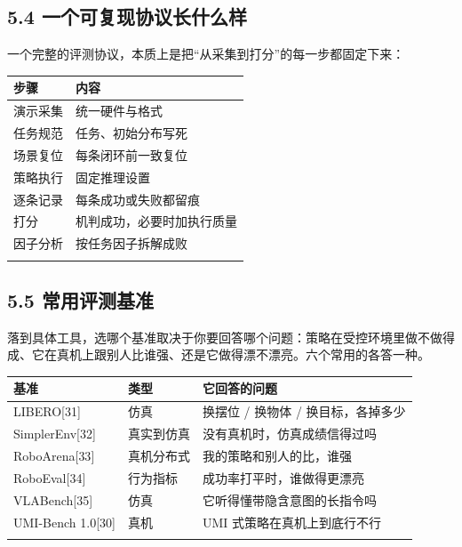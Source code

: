 \documentclass[
  chinese,
]{ctexart}
\begin{document}
\subsection{5.4
一个可复现协议长什么样}\label{ux4e00ux4e2aux53efux590dux73b0ux534fux8baeux957fux4ec0ux4e48ux6837}

一个完整的评测协议，本质上是把``从采集到打分''的每一步都固定下来：

\begin{center}
\begin{tabular}{@{}>{\raggedright\arraybackslash}p{} >{\raggedright\arraybackslash}p{}@{}}
\toprule\noalign{}
步骤 & 内容 \\
\midrule\noalign{}
演示采集 & 统一硬件与格式 \\
任务规范 & 任务、初始分布写死 \\
场景复位 & 每条闭环前一致复位 \\
策略执行 & 固定推理设置 \\
逐条记录 & 每条成功或失败都留痕 \\
打分 & 机判成功，必要时加执行质量 \\
因子分析 & 按任务因子拆解成败 \\
\bottomrule\noalign{}
\end{tabular}
\end{center}

\subsection{5.5
常用评测基准}\label{ux5e38ux7528ux8bc4ux6d4bux57faux51c6}

落到具体工具，选哪个基准取决于你要回答哪个问题：策略在受控环境里做不做得成、它在真机上跟别人比谁强、还是它做得漂不漂亮。六个常用的各答一种。

\begin{center}
\begin{tabular}{@{}>{\raggedright\arraybackslash}p{} >{\raggedright\arraybackslash}p{} >{\raggedright\arraybackslash}p{}@{}}
\toprule\noalign{}
基准 & 类型 & 它回答的问题 \\
\midrule\noalign{}
LIBERO{[}31{]} & 仿真 & 换摆位 / 换物体 / 换目标，各掉多少 \\
SimplerEnv{[}32{]} & 真实到仿真 & 没有真机时，仿真成绩信得过吗 \\
RoboArena{[}33{]} & 真机分布式 & 我的策略和别人的比，谁强 \\
RoboEval{[}34{]} & 行为指标 & 成功率打平时，谁做得更漂亮 \\
VLABench{[}35{]} & 仿真 & 它听得懂带隐含意图的长指令吗 \\
UMI-Bench 1.0{[}30{]} & 真机 & UMI 式策略在真机上到底行不行 \\
\bottomrule\noalign{}
\end{tabular}
\end{center}
\end{document}
